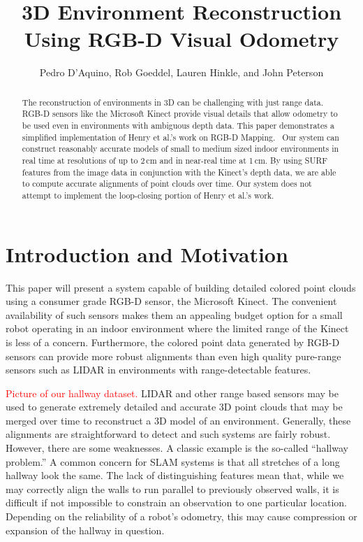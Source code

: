 \documentclass[letterpaper, 10pt, conference]{ieeeconf}
\title{\LARGE \bf	
    3D Environment Reconstruction Using RGB-D Visual Odometry
}
\author{Pedro D'Aquino, Rob Goeddel, Lauren Hinkle, and John Peterson}
\newcommand{\xxx}[1]{\textcolor{red}{#1}}
\begin{document}
\maketitle

\begin{abstract}
The reconstruction of environments in 3D can be challenging with just range
data. RGB-D sensors like the Microsoft Kinect provide visual details that
allow odometry to be used even in environments with ambiguous depth data.
This paper demonstrates a simplified implementation of Henry et al.'s work
on RGB-D Mapping.~\cite{Henry2010rgbd}
Our system can construct reasonably accurate models of
small to medium sized indoor environments in real time at resolutions of up
to 2\,cm and in near-real time at 1\,cm. By using SURF features from the image
data in conjunction with the Kinect's depth data, we are able to compute
accurate alignments of point clouds over time. Our system does not attempt to
implement the loop-closing portion of Henry et al.'s work.
\end{abstract}

\section{Introduction and Motivation}
This paper will present a system capable of building detailed colored point
clouds using a consumer grade RGB-D sensor, the Microsoft Kinect. The
convenient availability of such sensors makes them an appealing budget option
for a small robot operating in an indoor environment where the limited range
of the Kinect is less of a concern. Furthermore, the colored point data
generated by RGB-D sensors can provide more robust alignments than even high
quality pure-range sensors such as LIDAR in environments with range-detectable
features.

\xxx{Picture of our hallway dataset.}
LIDAR and other range based sensors may be used to generate extremely detailed
and accurate 3D point clouds that may be merged over time to reconstruct a 3D
model of an environment. Generally, these alignments are straightforward to
detect and such systems are fairly robust. However, there are some weaknesses.
A classic example is the so-called ``hallway problem.'' A common concern for
SLAM systems is that all stretches of a long hallway look the same. The lack
of distinguishing features mean that, while we may correctly align the walls
to run parallel to previously observed walls, it is difficult if not
impossible to constrain an observation to one particular location. Depending
on the reliability of a robot's odometry, this may cause compression or
expansion of the hallway in question.
\end{document}
